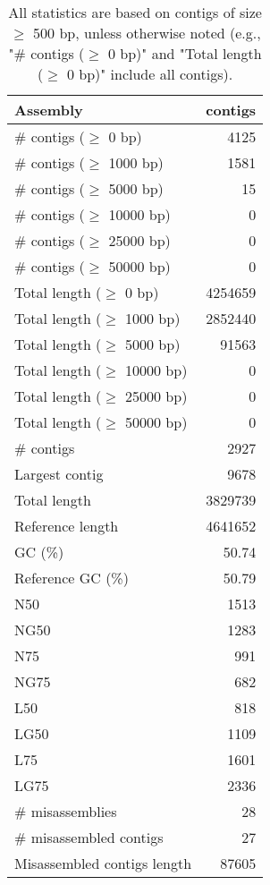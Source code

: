 \documentclass[12pt,a4paper]{article}
\begin{document}
\begin{table}[ht]
\begin{center}
\caption{All statistics are based on contigs of size $\geq$ 500 bp, unless otherwise noted (e.g., "\# contigs ($\geq$ 0 bp)" and "Total length ($\geq$ 0 bp)" include all contigs).}
\begin{tabular}{|l*{1}{|r}|}
\hline
Assembly & contigs \\ \hline
\# contigs ($\geq$ 0 bp) & 4125 \\ \hline
\# contigs ($\geq$ 1000 bp) & 1581 \\ \hline
\# contigs ($\geq$ 5000 bp) & 15 \\ \hline
\# contigs ($\geq$ 10000 bp) & 0 \\ \hline
\# contigs ($\geq$ 25000 bp) & 0 \\ \hline
\# contigs ($\geq$ 50000 bp) & 0 \\ \hline
Total length ($\geq$ 0 bp) & 4254659 \\ \hline
Total length ($\geq$ 1000 bp) & 2852440 \\ \hline
Total length ($\geq$ 5000 bp) & 91563 \\ \hline
Total length ($\geq$ 10000 bp) & 0 \\ \hline
Total length ($\geq$ 25000 bp) & 0 \\ \hline
Total length ($\geq$ 50000 bp) & 0 \\ \hline
\# contigs & 2927 \\ \hline
Largest contig & 9678 \\ \hline
Total length & 3829739 \\ \hline
Reference length & 4641652 \\ \hline
GC (\%) & 50.74 \\ \hline
Reference GC (\%) & 50.79 \\ \hline
N50 & 1513 \\ \hline
NG50 & 1283 \\ \hline
N75 & 991 \\ \hline
NG75 & 682 \\ \hline
L50 & 818 \\ \hline
LG50 & 1109 \\ \hline
L75 & 1601 \\ \hline
LG75 & 2336 \\ \hline
\# misassemblies & 28 \\ \hline
\# misassembled contigs & 27 \\ \hline
Misassembled contigs length & 87605 \\ \hline

\end{tabular}
\end{center}
\end{table}
\end{document}
